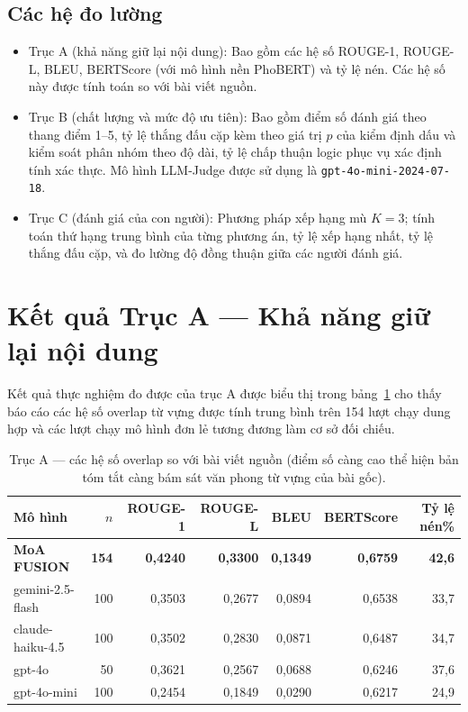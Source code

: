 \subsection{Các hệ đo lường}

\begin{itemize}
  \item Trục A (khả năng giữ lại nội dung): Bao gồm các hệ số ROUGE-1, ROUGE-L, BLEU, BERTScore (với mô hình nền PhoBERT) và tỷ lệ nén. Các hệ số này được tính toán so với bài viết nguồn.
  \item Trục B (chất lượng và mức độ ưu tiên): Bao gồm điểm số đánh giá theo thang điểm 1--5, tỷ lệ thắng đấu cặp kèm theo giá trị $p$ của kiểm định dấu và kiểm soát phân nhóm theo độ dài, tỷ lệ chấp thuận logic phục vụ xác định tính xác thực. Mô hình LLM-Judge được sử dụng là \texttt{gpt-4o-mini-2024-07-18}.
  \item Trục C (đánh giá của con người): Phương pháp xếp hạng mù $K = 3$; tính toán thứ hạng trung bình của từng phương án, tỷ lệ xếp hạng nhất, tỷ lệ thắng đấu cặp, và đo lường độ đồng thuận giữa các người đánh giá.
\end{itemize} 

\section{Kết quả Trục A --- Khả năng giữ lại nội dung}

Kết quả thực nghiệm đo được của trục A được biểu thị trong bảng~\ref{tab:axisA} cho thấy báo cáo các hệ số overlap từ vựng được tính trung bình trên 154 lượt chạy dung hợp và các lượt chạy mô hình đơn lẻ tương đương làm cơ sở đối chiếu.

\begin{table}[H]
  \centering
  \small
  \setlength{\tabcolsep}{4pt}
  \caption{Trục A --- các hệ số overlap so với bài viết nguồn (điểm số càng cao thể hiện bản tóm tắt càng bám sát văn phong từ vựng của bài gốc).}
  \label{tab:axisA}
  \begin{tabularx}{\linewidth}{Xrrrrrr}
    \toprule
    Mô hình & $n$ & ROUGE-1 & ROUGE-L & BLEU & BERTScore & Tỷ lệ nén\% \\
    \midrule
    \textbf{MoA FUSION}          & \textbf{154} & \textbf{0,4240} & \textbf{0,3300} & \textbf{0,1349} & \textbf{0,6759} & \textbf{42,6} \\
    gemini-2.5-flash             & 100 & 0,3503 & 0,2677 & 0,0894 & 0,6538 & 33,7 \\
    claude-haiku-4.5             & 100 & 0,3502 & 0,2830 & 0,0871 & 0,6487 & 34,7 \\
    gpt-4o                       & 50  & 0,3621 & 0,2567 & 0,0688 & 0,6246 & 37,6 \\
    gpt-4o-mini                  & 100 & 0,2454 & 0,1849 & 0,0290 & 0,6217 & 24,9 \\
    \bottomrule
  \end{tabularx}
\end{table}

